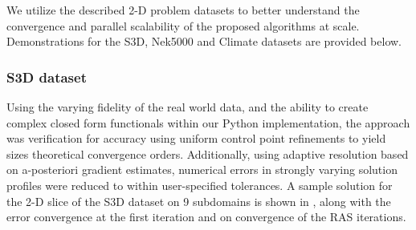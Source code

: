 We utilize the described 2-D problem datasets to better understand the convergence and parallel scalability of the proposed algorithms at scale. Demonstrations for the S3D, Nek5000 and Climate datasets are provided below.

\subsubsection{S3D dataset}
Using the varying fidelity of the real world data, and the ability to create complex closed form functionals within our Python implementation, the approach was verification for accuracy using uniform control point refinements to yield sizes theoretical convergence orders. Additionally, using adaptive resolution based on a-posteriori gradient estimates, numerical errors in strongly varying solution profiles were reduced to within user-specified tolerances. A sample solution for the 2-D slice of the S3D dataset on 9 subdomains is shown in , along with the error convergence at the first iteration and on convergence of the RAS iterations.

